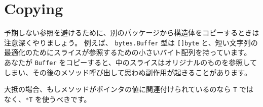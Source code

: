 \section{Copying}


予期しない参照を避けるために、別のパッケージから構造体をコピーするときは注意深くやりましょう。 例えば、 \texttt{bytes.Buffer} 型は \texttt{[]byte} と、短い文字列の最適化のためにスライスが参照するための小さいバイト配列を持っています。 あなたが \texttt{Buffer} をコピーすると、中のスライスはオリジナルのものを参照してしまい、その後のメソッド呼び出して思わぬ副作用が起きることがあります。

大抵の場合、もしメソッドがポインタの値に関連付けられているのなら \texttt{T} ではなく、\texttt{*T} を使うべきです。
